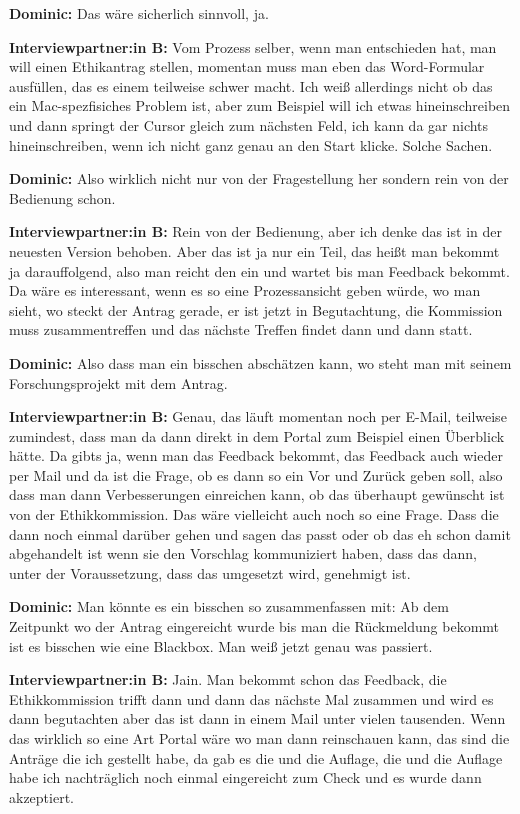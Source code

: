 \documentclass[a4paper,12pt,twoside]{scrreprt}
\begin{document}
\textbf{Dominic:} Das wäre sicherlich sinnvoll, ja.

\textbf{Interviewpartner:in B:} Vom Prozess selber, wenn man entschieden hat, man will einen Ethikantrag stellen, momentan muss man eben das Word-Formular ausfüllen, das es einem teilweise schwer macht. Ich weiß allerdings nicht ob das ein Mac-spezfisiches Problem ist, aber zum Beispiel will ich etwas hineinschreiben und dann springt der Cursor gleich zum nächsten Feld, ich kann da gar nichts hineinschreiben, wenn ich nicht ganz genau an den Start klicke. Solche Sachen.

\textbf{Dominic:} Also wirklich nicht nur von der Fragestellung her sondern rein von der Bedienung schon.

\textbf{Interviewpartner:in B:} Rein von der Bedienung, aber ich denke das ist in der neuesten Version behoben. Aber das ist ja nur ein Teil, das heißt man bekommt ja darauffolgend, also man reicht den ein und wartet bis man Feedback bekommt. Da wäre es interessant, wenn es so eine Prozessansicht geben würde, wo man sieht, wo steckt der Antrag gerade, er ist jetzt in Begutachtung, die Kommission muss zusammentreffen und das nächste Treffen findet dann und dann statt.

\textbf{Dominic:} Also dass man ein bisschen abschätzen kann, wo steht man mit seinem Forschungsprojekt mit dem Antrag.

\textbf{Interviewpartner:in B:} Genau, das läuft momentan noch per E-Mail, teilweise zumindest, dass man da dann direkt in dem Portal zum Beispiel einen Überblick hätte. Da gibts ja, wenn man das Feedback bekommt, das Feedback auch wieder per Mail und da ist die Frage, ob es dann so ein Vor und Zurück geben soll, also dass man dann Verbesserungen einreichen kann, ob das überhaupt gewünscht ist von der Ethikkommission. Das wäre vielleicht auch noch so eine Frage. Dass die dann noch einmal darüber gehen und sagen das passt oder ob das eh schon damit abgehandelt ist wenn sie den Vorschlag kommuniziert haben, dass das dann, unter der Voraussetzung, dass das umgesetzt wird, genehmigt ist.

\textbf{Dominic:} Man könnte es ein bisschen so zusammenfassen mit: Ab dem Zeitpunkt wo der Antrag eingereicht wurde bis man die Rückmeldung bekommt ist es bisschen wie eine Blackbox. Man weiß jetzt genau was passiert.

\textbf{Interviewpartner:in B:} Jain. Man bekommt schon das Feedback, die Ethikkommission trifft dann und dann das nächste Mal zusammen und wird es dann begutachten aber das ist dann in einem Mail unter vielen tausenden. Wenn das wirklich so eine Art Portal wäre wo man dann reinschauen kann, das sind die Anträge die ich gestellt habe, da gab es die und die Auflage, die und die Auflage habe ich nachträglich noch einmal eingereicht zum Check und es wurde dann akzeptiert.
\end{document}
